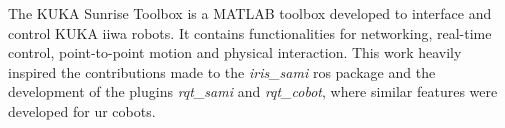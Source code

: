 \par The KUKA Sunrise Toolbox \cite{spec.kuka} is a MATLAB toolbox developed to interface and control KUKA iiwa robots. It contains functionalities for networking, real-time control, point-to-point motion and physical interaction. This work heavily inspired the contributions made to the \textit{iris\_sami} \ac{ros} package and the development of the plugins \textit{rqt\_sami} and \textit{rqt\_cobot}, where similar features were developed for \ac{ur} cobots.




